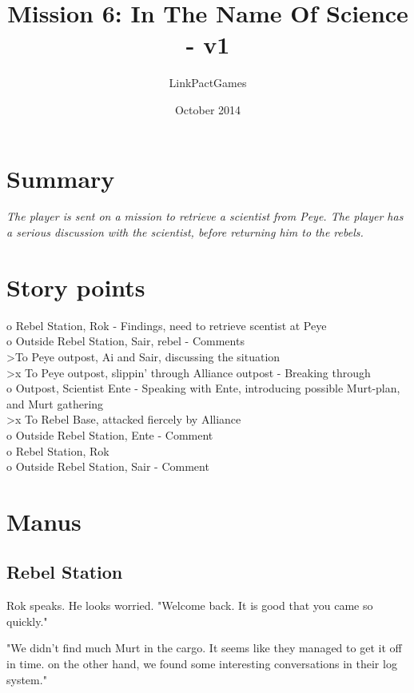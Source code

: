 \documentclass[a4paper,12pt]{article}
\begin{document}
\title{Mission 6: In The Name Of Science - v1}
\author{LinkPactGames}
\date{October 2014}
\maketitle

\section{Summary}

\textit{The player is sent on a mission to retrieve a scientist from Peye.
The player has a serious discussion with the scientist, before returning him
to the rebels.}

\section{Story points}

o Rebel Station, Rok - Findings, need to retrieve scentist at Peye\\
o Outside Rebel Station, Sair, rebel - Comments\\
\textgreater To Peye outpost, Ai and Sair, discussing the situation\\
\textgreater x To Peye outpost, slippin' through Alliance outpost - Breaking through\\
o Outpost, Scientist Ente - Speaking with Ente, introducing possible Murt-plan, and Murt
gathering\\
\textgreater x To Rebel Base, attacked fiercely by Alliance\\
o Outside Rebel Station, Ente - Comment\\
o Rebel Station, Rok\\
o Outside Rebel Station, Sair - Comment

\section{Manus}

\subsection{Rebel Station}

Rok speaks. He looks worried. "Welcome back. It is good that you came so quickly."

"We didn't find much Murt in the cargo. It seems like they managed to get it off in time.
on the other hand, we found some interesting conversations in their log system."
\end{document}
